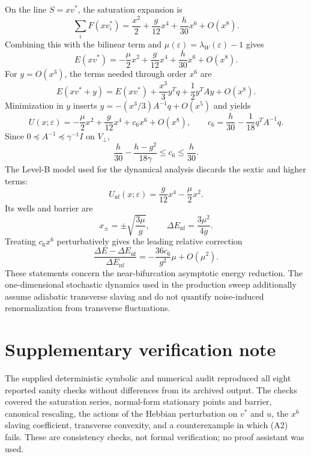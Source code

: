 \documentclass[a4paper,10pt]{article}
\begin{document}
On the line $S=xv^*$, the saturation expansion is
\[
\sum_i F(xv_i^*)
=\frac{x^2}{2}+\frac{g}{12}x^4+\frac{h}{30}x^6+O(x^8).
\]
Combining this with the bilinear term and
$\mu(\varepsilon)=\lambda_W(\varepsilon)-1$ gives
\[
E(xv^*)=-\frac{\mu}{2}x^2+\frac{g}{12}x^4+\frac{h}{30}x^6+O(x^8).
\]
For $y=O(x^3)$, the terms needed through order $x^6$ are
\[
E(xv^*+y)=E(xv^*)+\frac{x^3}{3}y^Tq+\frac12y^TAy+O(x^8).
\]
Minimization in $y$ inserts $y=-(x^3/3)A^{-1}q+O(x^5)$ and yields
\[
U(x;\varepsilon)
=-\frac{\mu}{2}x^2+\frac{g}{12}x^4+c_6x^6+O(x^8),
\qquad
\boxed{c_6=\frac{h}{30}-\frac1{18}q^TA^{-1}q}.
\]
Since $0\preceq A^{-1}\preceq\gamma^{-1}I$ on $V_\perp$,
\[
\frac{h}{30}-\frac{h-g^2}{18\gamma}
\leq c_6\leq\frac{h}{30}.
\]
The Level-B model used for the dynamical analysis discards the sextic and higher
terms:
\[
U_{\mathrm{nf}}(x;\varepsilon)=\frac{g}{12}x^4-\frac{\mu}{2}x^2.
\]
Its wells and barrier are
\[
x_\pm=\pm\sqrt{\frac{3\mu}{g}},\qquad
\Delta E_{\mathrm{nf}}=\frac{3\mu^2}{4g}.
\]
Treating $c_6x^6$ perturbatively gives the leading relative correction
\[
\frac{\Delta E-\Delta E_{\mathrm{nf}}}{\Delta E_{\mathrm{nf}}}
=-\frac{36c_6}{g^2}\mu+O(\mu^2).
\]
These statements concern the near-bifurcation asymptotic energy reduction. The
one-dimensional stochastic dynamics used in the production sweep additionally
assume adiabatic transverse slaving and do not quantify noise-induced
renormalization from transverse fluctuations.

\section*{Supplementary verification note}

The supplied deterministic symbolic and numerical audit reproduced all eight
reported sanity checks without differences from its archived output. The checks
covered the saturation series, normal-form stationary points and barrier,
canonical rescaling, the actions of the Hebbian perturbation on $v^*$ and $u$,
the $x^6$ slaving coefficient, transverse convexity, and a counterexample in
which (A2) fails. These are consistency checks, not formal verification; no proof
assistant was used.
\end{document}
